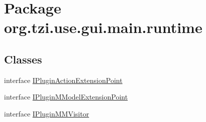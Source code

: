 \hypertarget{namespaceorg_1_1tzi_1_1use_1_1gui_1_1main_1_1runtime}{\section{Package org.\-tzi.\-use.\-gui.\-main.\-runtime}
\label{namespaceorg_1_1tzi_1_1use_1_1gui_1_1main_1_1runtime}
}
\subsection*{Classes}
\begin{DoxyCompactItemize}
\item 
interface \hyperlink{interfaceorg_1_1tzi_1_1use_1_1gui_1_1main_1_1runtime_1_1_i_plugin_action_extension_point}{I\-Plugin\-Action\-Extension\-Point}
\item 
interface \hyperlink{interfaceorg_1_1tzi_1_1use_1_1gui_1_1main_1_1runtime_1_1_i_plugin_m_model_extension_point}{I\-Plugin\-M\-Model\-Extension\-Point}
\item 
interface \hyperlink{interfaceorg_1_1tzi_1_1use_1_1gui_1_1main_1_1runtime_1_1_i_plugin_m_m_visitor}{I\-Plugin\-M\-M\-Visitor}
\end{DoxyCompactItemize}
